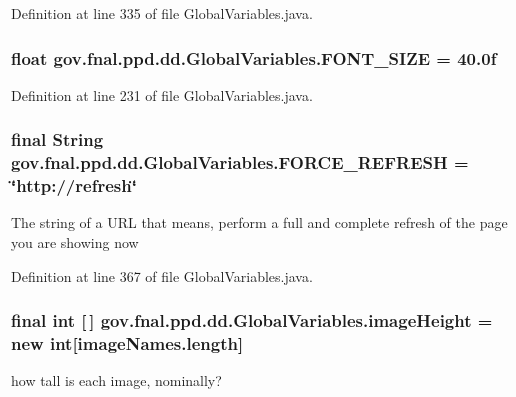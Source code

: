 Definition at line 335 of file Global\-Variables.\-java.

\hypertarget{classgov_1_1fnal_1_1ppd_1_1dd_1_1GlobalVariables_a9331af89f789ea1b54581c0198f7a43d}{
\subsubsection[{F\-O\-N\-T\-\_\-\-S\-I\-Z\-E}]{\setlength{\rightskip}{0pt plus 5cm}float gov.\-fnal.\-ppd.\-dd.\-Global\-Variables.\-F\-O\-N\-T\-\_\-\-S\-I\-Z\-E = 40.\-0f\hspace{0.3cm}{\ttfamily [static]}}}\label{classgov_1_1fnal_1_1ppd_1_1dd_1_1GlobalVariables_a9331af89f789ea1b54581c0198f7a43d}


Definition at line 231 of file Global\-Variables.\-java.

\hypertarget{classgov_1_1fnal_1_1ppd_1_1dd_1_1GlobalVariables_a79c44481889ff937b51e30d13d9c1c35}{
\subsubsection[{F\-O\-R\-C\-E\-\_\-\-R\-E\-F\-R\-E\-S\-H}]{\setlength{\rightskip}{0pt plus 5cm}final String gov.\-fnal.\-ppd.\-dd.\-Global\-Variables.\-F\-O\-R\-C\-E\-\_\-\-R\-E\-F\-R\-E\-S\-H = \char`\"{}http\-://refresh\char`\"{}\hspace{0.3cm}{\ttfamily [static]}}}\label{classgov_1_1fnal_1_1ppd_1_1dd_1_1GlobalVariables_a79c44481889ff937b51e30d13d9c1c35}
The string of a U\-R\-L that means, perform a full and complete refresh of the page you are showing now 

Definition at line 367 of file Global\-Variables.\-java.

\hypertarget{classgov_1_1fnal_1_1ppd_1_1dd_1_1GlobalVariables_a4c27cf0455687a5f58b71ae0d20fd671}{
\subsubsection[{image\-Height}]{\setlength{\rightskip}{0pt plus 5cm}final int \mbox{[}$\,$\mbox{]} gov.\-fnal.\-ppd.\-dd.\-Global\-Variables.\-image\-Height = new int\mbox{[}image\-Names.\-length\mbox{]}\hspace{0.3cm}{\ttfamily [static]}}}\label{classgov_1_1fnal_1_1ppd_1_1dd_1_1GlobalVariables_a4c27cf0455687a5f58b71ae0d20fd671}
how tall is each image, nominally? 

